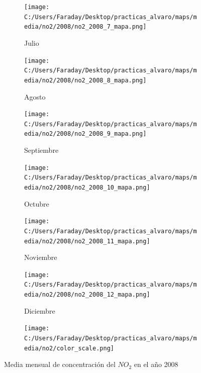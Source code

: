 \documentclass[12pt]{article}
\begin{document}
\begin{figure}[H]
\begin{subfigure}[H]{0.15\textwidth}
\texttt{[image: C:/Users/Faraday/Desktop/practicas\_alvaro/maps/media/no2/2008/no2\_2008\_7\_mapa.png]}
\captionsetup{labelformat=empty}
\caption{Julio}
\label{fig:map-no2-2008-7}
\end{subfigure}
%
\begin{subfigure}[H]{0.15\textwidth}
\texttt{[image: C:/Users/Faraday/Desktop/practicas\_alvaro/maps/media/no2/2008/no2\_2008\_8\_mapa.png]}
\captionsetup{labelformat=empty}
\caption{Agosto}
\label{fig:map-no2-2008-8}
\end{subfigure}
%
\begin{subfigure}[H]{0.15\textwidth}
\texttt{[image: C:/Users/Faraday/Desktop/practicas\_alvaro/maps/media/no2/2008/no2\_2008\_9\_mapa.png]}
\captionsetup{labelformat=empty}
\caption{Septiembre}
\label{fig:map-no2-2008-9}
\end{subfigure}
%
\begin{subfigure}[H]{0.15\textwidth}
\texttt{[image: C:/Users/Faraday/Desktop/practicas\_alvaro/maps/media/no2/2008/no2\_2008\_10\_mapa.png]}
\captionsetup{labelformat=empty}
\caption{Octubre}
\label{fig:map-no2-2008-10}
\end{subfigure}
%
\begin{subfigure}[H]{0.15\textwidth}
\texttt{[image: C:/Users/Faraday/Desktop/practicas\_alvaro/maps/media/no2/2008/no2\_2008\_11\_mapa.png]}
\captionsetup{labelformat=empty}
\caption{Noviembre}
\label{fig:map-no2-2008-11}
\end{subfigure}
%
\begin{subfigure}[H]{0.15\textwidth}
\texttt{[image: C:/Users/Faraday/Desktop/practicas\_alvaro/maps/media/no2/2008/no2\_2008\_12\_mapa.png]}
\captionsetup{labelformat=empty}
\caption{Diciembre}
\label{fig:map-no2-2008-12}
\end{subfigure}

\begin{subfigure}[H]{0.45\textwidth}
\texttt{[image: C:/Users/Faraday/Desktop/practicas\_alvaro/maps/media/no2/color\_scale.png]}
\captionsetup{labelformat=empty}
\caption{}
\end{subfigure}

\vspace*{-7mm}
\caption{Media mensual de concentración del $NO_{2}$ en el año 2008}
\label{fig:map-no2-2008}
\end{figure}
\end{document}
